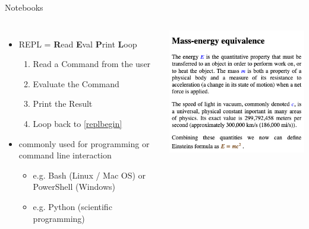 \documentclass{beamer}
\begin{document}
    \begin{frame}{Notebooks}
        \begin{columns}
            \begin{itemize}
                \item REPL = \textbf{R}ead \textbf{E}val \textbf{P}rint \textbf{L}oop
                \begin{enumerate}
                    \item\label{replbegin} Read a Command from the user
                    \item Evaluate the Command
                    \item Print the Result
                    \item Loop back to \ref{replbegin}
                \end{enumerate}
                \item commonly used for programming or command line interaction
                \begin{itemize}
                    \item e.g. Bash (Linux / Mac OS) or PowerShell (Windows)
                    \item e.g. Python (scientific programming)
                \end{itemize}
            \end{itemize}
            \includegraphics[scale=0.25]{images/doc}
        \end{columns}
    \end{frame}
\end{document}
